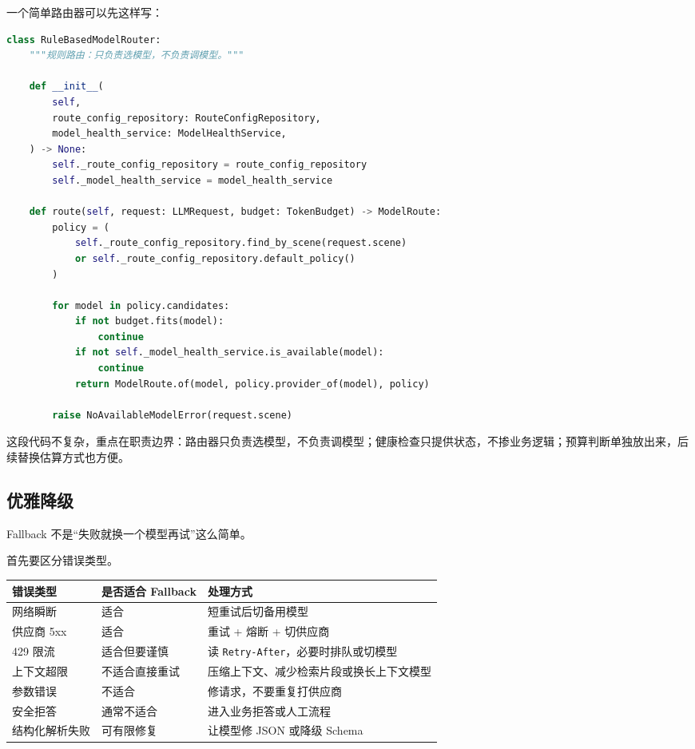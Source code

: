\documentclass[9pt,a4paper,twocolumn]{ctexart}
\begin{document}
一个简单路由器可以先这样写：



\begin{lstlisting}[language=Python]
class RuleBasedModelRouter:
    """规则路由：只负责选模型，不负责调模型。"""

    def __init__(
        self,
        route_config_repository: RouteConfigRepository,
        model_health_service: ModelHealthService,
    ) -> None:
        self._route_config_repository = route_config_repository
        self._model_health_service = model_health_service

    def route(self, request: LLMRequest, budget: TokenBudget) -> ModelRoute:
        policy = (
            self._route_config_repository.find_by_scene(request.scene)
            or self._route_config_repository.default_policy()
        )

        for model in policy.candidates:
            if not budget.fits(model):
                continue
            if not self._model_health_service.is_available(model):
                continue
            return ModelRoute.of(model, policy.provider_of(model), policy)

        raise NoAvailableModelError(request.scene)
\end{lstlisting}



这段代码不复杂，重点在职责边界：路由器只负责选模型，不负责调模型；健康检查只提供状态，不掺业务逻辑；预算判断单独放出来，后续替换估算方式也方便。



\subsection*{优雅降级}


Fallback 不是“失败就换一个模型再试”这么简单。



首先要区分错误类型。


{\footnotesize
\begin{tabular}{|p{}|p{}|p{}|}
\hline
\textbf{错误类型} & \textbf{是否适合 Fallback} & \textbf{处理方式} \\
\hline
网络瞬断 & 适合 & 短重试后切备用模型 \\
\hline
供应商 5xx & 适合 & 重试 + 熔断 + 切供应商 \\
\hline
429 限流 & 适合但要谨慎 & 读 \texttt{Retry-After}，必要时排队或切模型 \\
\hline
上下文超限 & 不适合直接重试 & 压缩上下文、减少检索片段或换长上下文模型 \\
\hline
参数错误 & 不适合 & 修请求，不要重复打供应商 \\
\hline
安全拒答 & 通常不适合 & 进入业务拒答或人工流程 \\
\hline
结构化解析失败 & 可有限修复 & 让模型修 JSON 或降级 Schema \\
\hline
\end{tabular}
}
\end{document}
